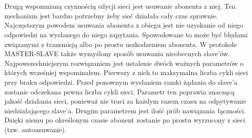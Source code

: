 		\\
		\\
		Drugą wspomnianą czynnością edycji sieci jest usuwanie abonenta z niej. Ten mechanizm jest bardzo potrzebny żeby sieć działała cały czas sprawnie. Najczęstszym powodem usuwania abonenta z obiegu jest nie uzyskanie od niego odpowiedzi na wysłanego do niego zapytania. Spowodowane to może być błędami związanymi z transmisją albo po prostu uszkodzeniem abonenta. W protokole MASTER-SLAVE także wymyślony sposób usuwania nieobecnych slave'ów. Najpowszechniejszym rozwiązaniem jest ustalenie dwóch ważnych parametrów o których wcześniej wspominałem. Pierwszy z nich  to maksymalna liczba cykli sieci przy braku odpowiedzi. Przed ponownym wysłaniem ramki żądania do slave'a zostanie odczekana pewna liczba cykli sieci. Parametr ten poprawia znaczącą jakość działania sieci, ponieważ nie traci za każdym razem czasu na odpytywanie niedziałającego slave'a. Drugim parametrem jest ilość prób nawiązania łączności. Dzięki niemu po określonym czasie abonent zostanie po prostu wyrzucony z sieci (tzw. autousuwanie).
		